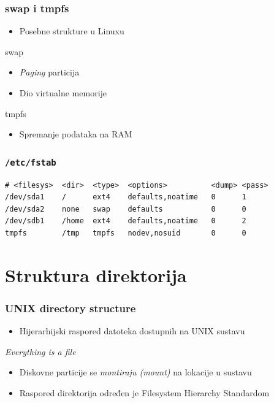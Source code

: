 \documentclass[t]{beamer}
\begin{document}
\begin{frame}
	\frametitle{swap i tmpfs}
	\begin{itemize}
		\item Posebne strukture u Linuxu
	\end{itemize}
	swap
	\begin{itemize}
		\item \emph{Paging} particija
		\item Dio virtualne memorije
	\end{itemize}
	tmpfs
	\begin{itemize}
		\item Spremanje podataka na RAM
	\end{itemize}
\end{frame}


\begin{frame}[fragile]
	\frametitle{\texttt{/etc/fstab}}
\begin{verbatim}
# <filesys>  <dir>  <type>  <options>          <dump> <pass>
/dev/sda1    /      ext4    defaults,noatime   0      1
/dev/sda2    none   swap    defaults           0      0
/dev/sdb1    /home  ext4    defaults,noatime   0      2
tmpfs        /tmp   tmpfs   nodev,nosuid       0      0
\end{verbatim}
\end{frame}

\section{Struktura direktorija}
\begin{frame}
	\frametitle{UNIX directory structure}
	\begin{itemize}
		\item Hijerarhijski raspored datoteka dostupnih na UNIX sustavu
	\end{itemize}
	\vfill
	\emph{Everything is a file}
	\vfill
	\begin{itemize}
		\item Diskovne particije se \emph{montiraju (mount)} na lokacije u sustavu
		\item Raspored direktorija određen je Filesystem Hierarchy Standardom
	\end{itemize}
	\vfill
\end{frame}
\end{document}
